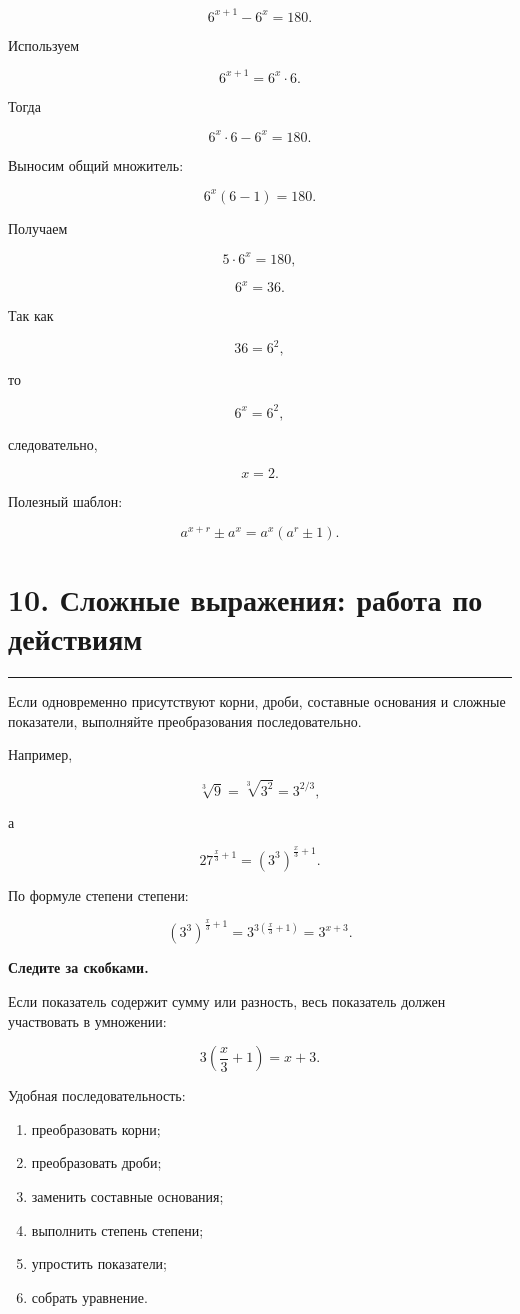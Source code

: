 \documentclass[a4paper,12pt]{article}
\newcommand{\sectionline}{\par\vspace{0.15em}\noindent\textcolor{accent}{\rule{\linewidth}{0.7pt}}\par\vspace{0.2em}}
\newcommand{\key}[1]{\textcolor{darkaccent}{\textbf{#1}}}
\begin{document}
\[
6^{x+1}-6^x=180.
\]

Используем

\[
6^{x+1}=6^x\cdot6.
\]

Тогда

\[
6^x\cdot6-6^x=180.
\]

Выносим общий множитель:

\[
6^x(6-1)=180.
\]

Получаем

\[
5\cdot6^x=180,
\]

\[
6^x=36.
\]

Так как

\[
36=6^2,
\]

то

\[
6^x=6^2,
\]

следовательно,

\[
\boxed{x=2}.
\]

Полезный шаблон:

\[
a^{x+r}\pm a^x
=
a^x\left(a^r\pm1\right).
\]


\section*{10. Сложные выражения: работа по действиям}
\sectionline

Если одновременно присутствуют корни, дроби, составные основания и сложные показатели, выполняйте преобразования последовательно.

Например,

\[
\sqrt[3]{9}
=
\sqrt[3]{3^2}
=
3^{2/3},
\]

а

\[
27^{\frac{x}{3}+1}
=
\left(3^3\right)^{\frac{x}{3}+1}.
\]

По формуле степени степени:

\[
\left(3^3\right)^{\frac{x}{3}+1}
=
3^{3\left(\frac{x}{3}+1\right)}
=
3^{x+3}.
\]

\key{Следите за скобками.}

Если показатель содержит сумму или разность, весь показатель должен участвовать в умножении:

\[
3\left(\frac{x}{3}+1\right)=x+3.
\]

Удобная последовательность:

\begin{enumerate}
  \item преобразовать корни;
  \item преобразовать дроби;
  \item заменить составные основания;
  \item выполнить степень степени;
  \item упростить показатели;
  \item собрать уравнение.
\end{enumerate}
\end{document}
